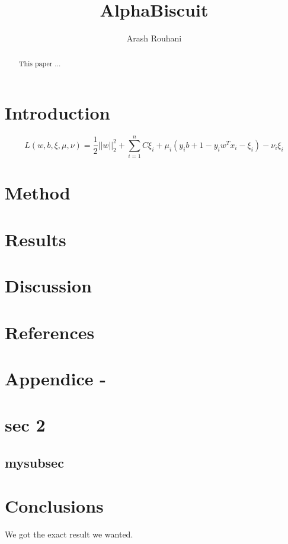 \documentclass[a4paper,11pt]{article}
\title{AlphaBiscuit}
\author{Arash Rouhani}
\begin{document}
\maketitle

\begin{abstract}
This paper ...

\end{abstract}

\section{Introduction}
\begin{equation}
L(w, b, \xi, \mu, \nu) = \frac{1}{2} ||w||^2_2 + \sum\limits_{i=1}^n {C\xi_i + \mu_i(y_ib + 1 - y_iw^Tx_i - \xi_i) - \nu_i\xi_i}
\end{equation}
\section{Method}
\section{Results}
\section{Discussion}
\section{References}
\section{Appendice -}
\section{sec 2}

\subsection{mysubsec}
\section{Conclusions}
We got the exact result we wanted.
\end{document}
